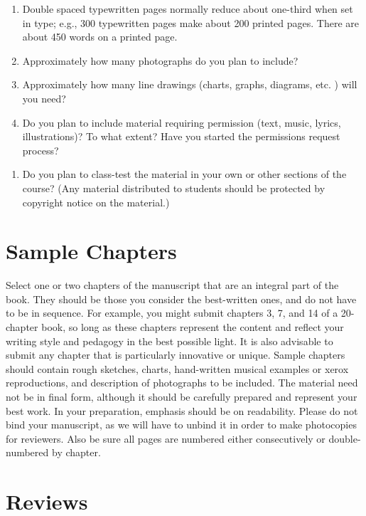 \documentclass[10pt,dvipsnames,enabledeprecatedfontcommands]{scrartcl}
\providecommand{\tightlist}{%
  \setlength{\itemsep}{0pt}\setlength{\parskip}{0pt}}
\begin{document}
\begin{enumerate}
\def\labelenumi{\alph{enumi}.}
\item
  Double spaced typewritten pages normally reduce about one-third when
  set in type; e.g., 300 typewritten pages make about 200 printed pages.
  There are about 450 words on a printed page.
\item
  Approximately how many photographs do you plan to include?
\item
  Approximately how many line drawings (charts, graphs, diagrams, etc. )
  will you need?
\item
  Do you plan to include material requiring permission (text, music,
  lyrics, illustrations)? To what extent? Have you started the
  permissions request process?
\end{enumerate}

\begin{enumerate}
\def\labelenumi{\arabic{enumi}.}
\setcounter{enumi}{2}
\tightlist
\item
  Do you plan to class-test the material in your own or other sections
  of the course? (Any material distributed to students should be
  protected by copyright notice on the material.)
\end{enumerate}

\section{Sample Chapters}\label{sample-chapters}

Select one or two chapters of the manuscript that are an integral part
of the book. They should be those you consider the best-written ones,
and do not have to be in sequence. For example, you might submit
chapters 3, 7, and 14 of a 20-chapter book, so long as these chapters
represent the content and reflect your writing style and pedagogy in the
best possible light. It is also advisable to submit any chapter that is
particularly innovative or unique. Sample chapters should contain rough
sketches, charts, hand-written musical examples or xerox reproductions,
and description of photographs to be included. The material need not be
in final form, although it should be carefully prepared and represent
your best work. In your preparation, emphasis should be on readability.
Please do not bind your manuscript, as we will have to unbind it in
order to make photocopies for reviewers. Also be sure all pages are
numbered either consecutively or double-numbered by chapter.

\section{Reviews}\label{reviews}
\end{document}
